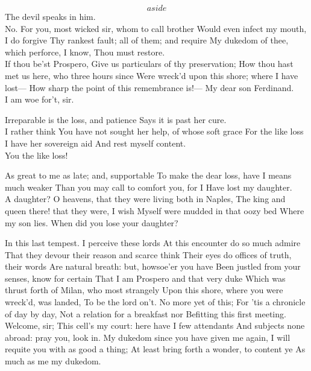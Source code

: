 \documentclass[11pt]{book}
\begin{document}
\8	\[aside\]  The devil speaks in him. \\

\1	No.
	For you, most wicked sir, whom to call brother
	Would even infect my mouth, I do forgive
	Thy rankest fault; all of them; and require
	My dukedom of thee, which perforce, I know,
	Thou must restore. \\

\6	                  If thou be'st Prospero,
	Give us particulars of thy preservation;
	How thou hast met us here, who three hours since
	Were wreck'd upon this shore; where I have lost---
	How sharp the point of this remembrance is!---
	My dear son Ferdinand. \\

\1	I am woe for't, sir.

\6	Irreparable is the loss, and patience
	Says it is past her cure. \\

\1	I rather think
	You have not sought her help, of whose soft grace
	For the like loss I have her sovereign aid
	And rest myself content. \\

\6	You the like loss!

\1	As great to me as late; and, supportable
	To make the dear loss, have I means much weaker
	Than you may call to comfort you, for I
	Have lost my daughter. \\

\6	A daughter?
	O heavens, that they were living both in Naples,
	The king and queen there! that they were, I wish
	Myself were mudded in that oozy bed
	Where my son lies. When did you lose your daughter?

\1	In this last tempest. I perceive these lords
	At this encounter do so much admire
	That they devour their reason and scarce think
	Their eyes do offices of truth, their words
	Are natural breath: but, howsoe'er you have
	Been justled from your senses, know for certain
	That I am Prospero and that very duke
	Which was thrust forth of Milan, who most strangely
	Upon this shore, where you were wreck'd, was landed,
	To be the lord on't. No more yet of this;
	For 'tis a chronicle of day by day,
	Not a relation for a breakfast nor
	Befitting this first meeting. Welcome, sir;
	This cell's my court: here have I few attendants
	And subjects none abroad: pray you, look in.
	My dukedom since you have given me again,
	I will requite you with as good a thing;
	At least bring forth a wonder, to content ye
	As much as me my dukedom.
\end{document}
